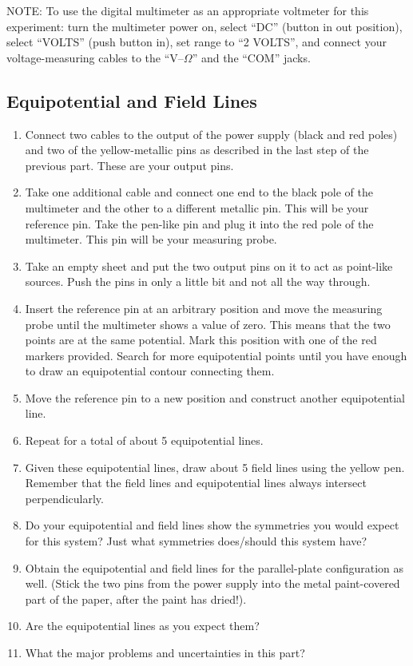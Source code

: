 NOTE: To use the digital multimeter as an appropriate voltmeter for this experiment: turn the multimeter power on, select ``DC'' (button in out position), select ``VOLTS'' (push button in), set range to ``2 VOLTS'', and connect your voltage-measuring cables to the ``$\mathrm{V}$--$\Omega$'' and the ``COM'' jacks.

\subsection{Equipotential and Field Lines}

\begin{enumerate}
    \item Connect two cables to the output of the power supply (black and red poles) and two of the yellow-metallic pins as described in the last step of the previous part. These are your output pins.
    \item Take one additional cable and connect one end to the black pole of the multimeter and the other to a different metallic pin. This will be your reference pin. Take the pen-like pin and plug it into the red pole of the multimeter. This pin will be your measuring probe.
    \item Take an empty sheet and put the two output pins on it to act as point-like sources. Push the pins in only a little bit and not all the way through.
    \item Insert the reference pin at an arbitrary position and move the measuring probe until the multimeter shows a value of zero. This means that the two points are at the same potential. Mark this position with one of the red markers provided. Search for more equipotential points until you have enough to draw an equipotential contour connecting them.
    \item Move the reference pin to a new position and construct another equipotential line.
    \item Repeat for a total of about 5 equipotential lines.
    \item Given these equipotential lines, draw about 5 field lines using the yellow pen. Remember that the field lines and equipotential lines always intersect perpendicularly.
    \item Do your equipotential and field lines show the symmetries you would expect for this system? Just what symmetries does/should this system have?
    \item Obtain the equipotential and field lines for the parallel-plate configuration as well. (Stick the two pins from the power supply into the metal paint-covered part of the paper, after the paint has dried!).
    \item Are the equipotential lines as you expect them?
    \item What the major problems and uncertainties in this part?
\end{enumerate}

